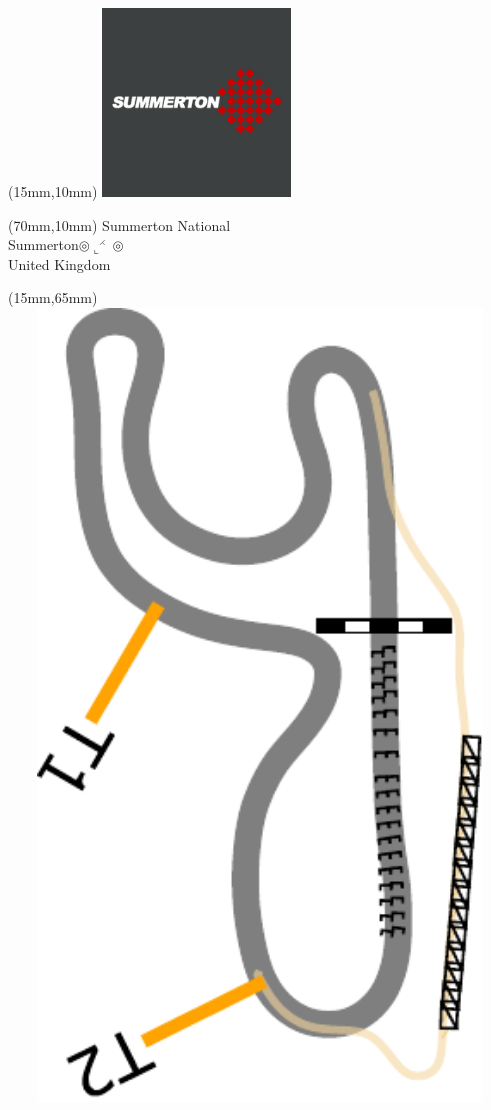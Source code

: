 \null\newpage
\begin{textblock*}{50mm}(15mm,10mm)%
\includegraphics[width=50mm]{LG/SUMM.png}
\end{textblock*}
\begin{textblock*}{130mm}(70mm,10mm)%
{\fontsize{20}{20}\selectfont Summerton National\\}
{\fontsize{16}{16}\selectfont Summerton\hfill $\circledcirc\llcorner^{\rightthreetimes}\circledcirc$\\}
{\fontsize{12}{12}\selectfont United Kingdom\\}
\end{textblock*}
\begin{textblock*}{185mm}(15mm,65mm)%
\centering
\mbox{\includegraphics[width=185mm,height=210mm,keepaspectratio]{PT/SUMMNA.pdf}}
\end{textblock*}
